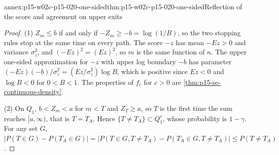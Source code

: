 \begin{annexitem}{annex:p15-w02c-p15-020-one-sided}{thm:p15-w02c-p15-020-one-sided}{Reflection of the score and agreement on upper exits}
\begin{proof}
(1) \(Z_m\leq b\) if and only if \(-Z_m\geq-b=\log(1/B)\), so the two
stopping rules stop at the same time on every path. The score \(-z\)
has mean \(-Ez>0\) and variance \(\sigma_z^2\), and
\((-Ez)^2=(Ez)^2\), so \(m\) is the same function of \(n\). The upper
one-sided approximation for \(-z\) with upper log boundary \(-b\) has
parameter \((-Ez)(-b)/\sigma_z^2=(Ez/\sigma_z^2)\log B\), which is
positive since \(Ez<0\) and \(\log B<0\) for \(0<B<1\). The properties
of \(f_c\) for \(c>0\) are \cref{thm:p15-se-continuous-density}.

(2) On \(Q_1\), \(b<Z_m<a\) for \(m<T\) and \(Z_T\geq a\), so \(T\) is
the first time the sum reaches \([a,\infty)\), that is \(T=T_A\). Hence
\(\{T\neq T_A\}\subset Q_1^c\), whose probability is \(1-\gamma\). For
any set \(G\),
\(|P(T\in G)-P(T_A\in G)|=|P(T\in G,T\neq T_A)-P(T_A\in G,T\neq T_A)|\leq P(T\neq T_A)\).
\end{proof}
\end{annexitem}

